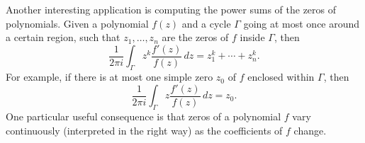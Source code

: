 \documentclass[12pt,openany]{book}
\theoremstyle{plain}
\theoremstyle{remark}
\theoremstyle{definition}
\theoremstyle{exercise}
\theoremstyle{example}
\begin{document}
Another interesting application is computing the power sums of the zeros of
polynomials.  Given a polynomial $f(z)$ and a cycle $\Gamma$ going at most
once around a certain region, such that $z_1,\ldots,z_n$ are the zeros of $f$
inside $\Gamma$, then
\begin{equation*}
\frac{1}{2\pi i}
\int_\Gamma z^k \frac{f'(z)}{f(z)} \, dz
=
z_1^k + \cdots + z_n^k .
\end{equation*}
For example, if there is at most one simple zero $z_0$ of
$f$ enclosed within $\Gamma$, then
\begin{equation*}
\frac{1}{2\pi i}
\int_\Gamma z \frac{f'(z)}{f(z)} \, dz
=
z_0 .
\end{equation*}
One particular useful consequence is that zeros of a polynomial $f$ vary continuously
(interpreted in the right way) as the coefficients of $f$ change.
\end{document}
